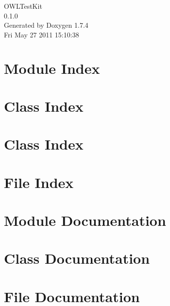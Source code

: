 \documentclass[a4paper]{book}
\begin{document}
\begin{titlepage}
\vspace*{7cm}
\begin{center}
{\Large OWLTestKit \\[1ex]\large 0.1.0 }\\
\vspace*{1cm}
{\large Generated by Doxygen 1.7.4}\\
\vspace*{0.5cm}
{\small Fri May 27 2011 15:10:38}\\
\end{center}
\end{titlepage}
\clearemptydoublepage
{}
\tableofcontents
\clearemptydoublepage
{}
\chapter{Module Index}

\chapter{Class Index}

\chapter{Class Index}

\chapter{File Index}

\chapter{Module Documentation}








\chapter{Class Documentation}













\chapter{File Documentation}




















\printindex
\end{document}
